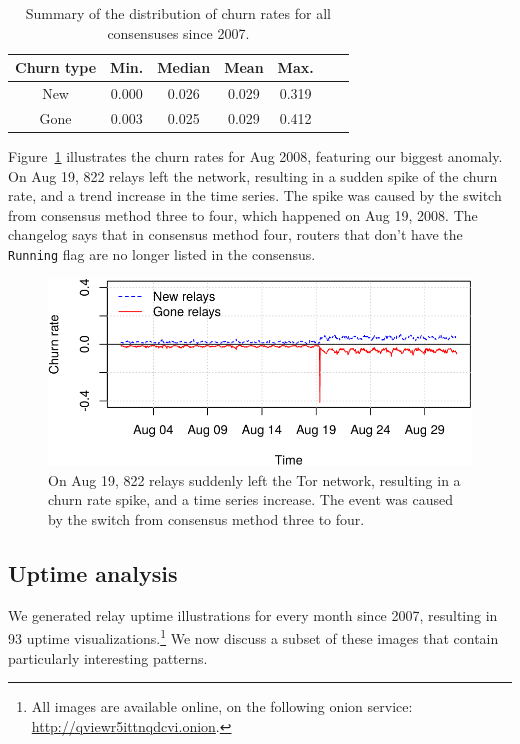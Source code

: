 \begin{table}[t]
	\centering
	\begin{tabular}{ccccccc}
	\textbf{Churn type} & \textbf{Min.} & \textbf{Median} & \textbf{Mean} & \textbf{Max.} \\
	\hline
	New & 0.000 & 0.026 & 0.029 & 0.319 \\
	Gone & 0.003 & 0.025 & 0.029 & 0.412 \\
	\end{tabular}
	\caption{Summary of the distribution of churn rates for all consensuses
	since 2007.}
	\label{tab:churn-dist}
\end{table}

Figure~\ref{fig:2008-08} illustrates the churn rates for Aug 2008, featuring
our biggest anomaly.  On Aug 19, 822 relays left the network, resulting in a
sudden spike of the churn rate, and a trend increase in the time series.  The
spike was caused by the switch from consensus method three to four, which
happened on Aug 19, 2008.  The changelog says that in consensus method four,
routers that don't have the \texttt{Running} flag are no longer listed in the
consensus.

\begin{figure}[t]
	\centering
	\includegraphics[width=\linewidth]{diagrams/2008-08.pdf}
	\caption{On Aug 19, 822 relays suddenly left the Tor network, resulting
	in a churn rate spike, and a time series increase.  The event was caused by
	the switch from consensus method three to four.}
	\label{fig:2008-08}
\end{figure}


\subsection{Uptime analysis}
\label{sec:uptime}
We generated relay uptime illustrations for every month since 2007, resulting in
93 uptime visualizations.\footnote{All images are available online, on the following
onion service: \url{http://qviewr5ittnqdcvi.onion}.}
We now discuss a subset of these images that
contain particularly interesting patterns.

